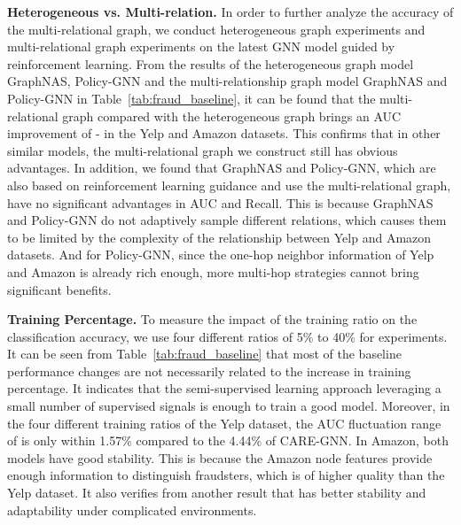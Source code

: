 \textbf{Heterogeneous vs. Multi-relation. }
In order to further analyze the accuracy of the multi-relational graph, we conduct heterogeneous graph experiments and multi-relational graph experiments on the latest GNN model guided by reinforcement learning. 
From the results of the heterogeneous graph model GraphNAS, Policy-GNN and the multi-relationship graph model GraphNAS and Policy-GNN in Table~\ref{tab:fraud_baseline}, it can be found that the multi-relational graph compared with the heterogeneous graph brings an AUC improvement of - in the Yelp and Amazon datasets. 
This confirms that in other similar models, the multi-relational graph we construct still has obvious advantages. 
In addition, we found that GraphNAS and Policy-GNN, which are also based on reinforcement learning guidance and use the multi-relational graph, have no significant advantages in AUC and Recall. 
This is because GraphNAS and Policy-GNN do not adaptively sample different relations, which causes them to be limited by the complexity of the relationship between Yelp and Amazon datasets. 
And for Policy-GNN, since the one-hop neighbor information of Yelp and Amazon is already rich enough, more multi-hop strategies cannot bring significant benefits. 


\textbf{Training Percentage. }
To measure the impact of the training ratio on the classification accuracy, we use four different ratios of 5\% to 40\% for experiments.
It can be seen from Table~\ref{tab:fraud_baseline} that most of the baseline performance changes are not necessarily related to the increase in training percentage.
It indicates that the semi-supervised learning approach leveraging a small number of supervised signals is enough to train a good model.
Moreover, in the four different training ratios of the Yelp dataset, the AUC fluctuation range of \RioGNN is only within 1.57\% compared to the 4.44\% of CARE-GNN.
In Amazon, both models have good stability.
This is because the Amazon node features provide enough information to distinguish fraudsters, which is of higher quality than the Yelp dataset.
It also verifies from another result that \RioGNN has better stability and adaptability under complicated environments.




